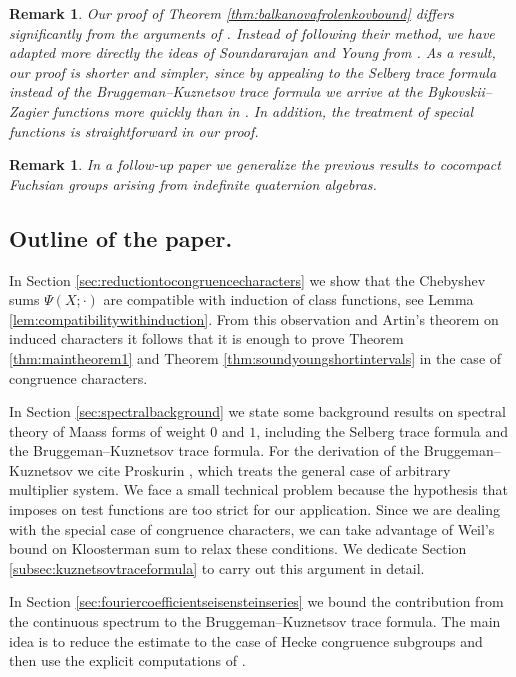 \documentclass{article}
\newtheorem{remark}[thm]{Remark}
\theoremstyle{named}
\begin{document}
\begin{remark}
Our proof of Theorem \ref{thm:balkanovafrolenkovbound} differs significantly from the arguments of \cite{balkanova_frolenkov}. Instead of following their method, we have adapted more directly the ideas of Soundararajan and Young from \cite{Soundararajan_2013}. As a result, our proof is shorter and simpler, since by appealing to the Selberg trace formula instead of the Bruggeman--Kuznetsov trace formula we arrive at the Bykovskii--Zagier functions more quickly than in \cite{balkanova_frolenkov}. In addition, the treatment of special functions is straightforward in our proof.
\end{remark}

\begin{remark}
In a follow-up paper we generalize the previous results to cocompact Fuchsian groups arising from indefinite quaternion algebras. 
\end{remark}

\subsection{Outline of the paper.}
In Section \ref{sec:reductiontocongruencecharacters} we show that the Chebyshev sums $\Psi(X; \cdot)$ are compatible with induction of class functions, see Lemma \ref{lem:compatibilitywithinduction}. From this observation and Artin's theorem on induced characters \cite[Corollary 9.2]{serrelinearreps} it follows that it is enough to prove Theorem \ref{thm:maintheorem1} and Theorem \ref{thm:soundyoungshortintervals} in the case of congruence characters.

In Section \ref{sec:spectralbackground} we state some background results on spectral theory of Maass forms of weight $0$ and $1$, including the Selberg trace formula and the Bruggeman--Kuznetsov trace formula. For the derivation of the Bruggeman--Kuznetsov we cite Proskurin \cite{proskurinarbitraryweightkuznetsov}, which treats the general case of arbitrary multiplier system. We face a small technical problem because the hypothesis that \cite{proskurinarbitraryweightkuznetsov} imposes on test functions are too strict for our application. Since we are dealing with the special case of congruence characters, we can take advantage of Weil's bound on Kloosterman sum to relax these conditions. We dedicate Section \ref{subsec:kuznetsovtraceformula} to carry out this argument in detail.

In Section \ref{sec:fouriercoefficientseisensteinseries} we bound the contribution from the continuous spectrum to the Bruggeman--Kuznetsov trace formula. The main idea is to reduce the estimate to the case of Hecke congruence subgroups and then use the explicit computations of \cite{youngeisensteinseries}. 
\end{document}

